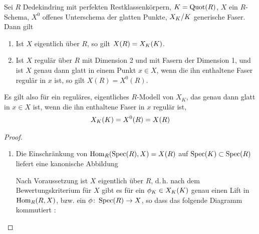 \documentclass[german]{scrreprt}
\begin{document}
\begin{Satz}\label{thm:ratpkteregulaeremodelle}
  Sei $R$ Dedekindring
  mit perfekten Restklassenkörpern,
  $K=\operatorname{Quot}(R)$,
  $X$ ein $R$-Schema,
  $X^0$ offenes Unterschema der glatten Punkte,
  $X_{K}/K$ generische Faser.
  Dann gilt
  \begin{enumerate}[label=(\roman*)]
  \item Ist $X$ eigentlich über $R$, so gilt $X(R)=X_{K}(K)$.
  \item Ist $X$ regulär über $R$ mit Dimension 2 und mit
    Fasern der Dimension 1, und ist $X$ genau dann glatt in einem
    Punkt $x\in X$, wenn die ihn enthaltene Faser regulär in $x$ ist,
    so gilt $X(R)=X^0(R)$.
  \end{enumerate}
  \cite[Corollary IV.4.4]{silverman2}

  Es gilt also für ein reguläres, eigentliches $R$-Modell von $X_K$,
  das genau dann glatt in $x\in X$ ist, wenn die ihn enthaltene
  Faser in $x$ regulär ist,
  \begin{gather*}
    X_{K}(K)=X^0(R)=X(R)
  \end{gather*}
  \begin{proof}
    \begin{enumerate}[label=(\roman*)]
    \item
      Die Einschränkung von $\operatorname{Hom}_R(\operatorname{Spec}(R),X)=X(R)$ auf 
      $\operatorname{Spec}(K)\subset\operatorname{Spec}(R)$ liefert eine kanonische Abbildung
      \begin{center}
      \end{center}
      Nach Voraussetzung ist $X$ eigentlich über $R$, d.\,h. nach
      dem Bewertungskriterium für $X$ gibt es für ein $\phi_{K}\in
      X_{K}(K)$ genau einen Lift in $\operatorname{Hom}_R(R,X)$,
      bzw. ein $\phi\colon\operatorname{Spec}(R)\to X$, so dass das folgende
      Diagramm kommutiert
      \cite[Theorem II.4.7]{hartshorne}:
      \begin{center}
\end{center}
\end{enumerate}
\end{proof}
\end{Satz}
\end{document}
